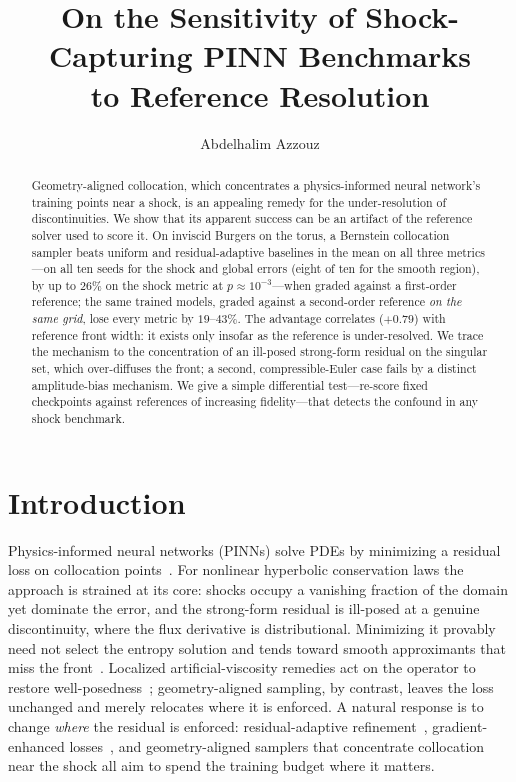 \documentclass[11pt]{article}
\title{On the Sensitivity of Shock-Capturing PINN Benchmarks\\
to Reference Resolution}
\author[1]{Abdelhalim Azzouz}
\affil[1]{Department of Mathematics, University of Naama, Algeria}
\date{}
\begin{document}
\maketitle

\begin{abstract}
Geometry-aligned collocation, which concentrates a physics-informed neural
network's training points near a shock, is an appealing remedy for the
under-resolution of discontinuities. We show that its apparent success can be an
artifact of the reference solver used to score it. On inviscid Burgers on the
torus, a Bernstein collocation sampler beats uniform and residual-adaptive
baselines in the mean on all three metrics---on all ten seeds for the shock and
global errors (eight of ten for the smooth region), by up to $26\%$ on the shock
metric at $p\approx10^{-3}$---when graded against a first-order reference; the same trained models, graded
against a second-order reference \emph{on the same grid}, lose every metric by
$19$--$43\%$. The advantage correlates ($+0.79$) with reference front width: it
exists only insofar as the reference is under-resolved. We trace the mechanism to
the concentration of an ill-posed strong-form residual on the singular set, which
over-diffuses the front; a second, compressible-Euler case fails by a distinct
amplitude-bias mechanism. We give a simple differential test---re-score fixed
checkpoints against references of increasing fidelity---that detects the confound
in any shock benchmark.
\end{abstract}

\section{Introduction}\label{sec:intro}
Physics-informed neural networks (PINNs) solve PDEs by minimizing a residual
loss on collocation points~\cite{Raissi2019}. For nonlinear hyperbolic
conservation laws the approach is strained at its core: shocks occupy a vanishing
fraction of the domain yet dominate the error, and the strong-form residual is
ill-posed at a genuine discontinuity, where the flux derivative is distributional.
Minimizing it provably need not select the entropy solution and tends toward
smooth approximants that miss the front~\cite{DeRyckMishra2024,Krishnapriyan2021,
Fuks2020}. Localized artificial-viscosity remedies act on the operator to restore well-posedness~\cite{Coutinho2023}; geometry-aligned sampling, by contrast, leaves the loss unchanged and merely relocates where it is enforced. A natural response is to change \emph{where} the residual is enforced:
residual-adaptive refinement~\cite{Lu2021}, gradient-enhanced
losses~\cite{Yu2022}, and geometry-aligned samplers that concentrate collocation
near the shock all aim to spend the training budget where it matters.
\end{document}
